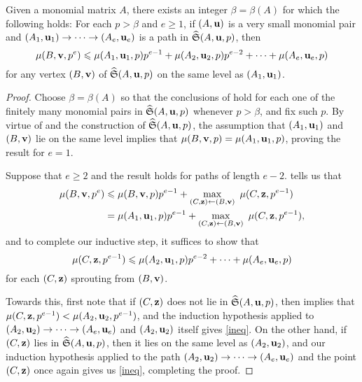 \documentclass[11pt]{amsart}
\begin{document}
\begin{lemma}\label{lem: upper bound for higher mu}
   Given a monomial matrix $A$, there exists an integer $\beta= \beta(A)$ for which the following holds\textup:
   For each $p>\beta$ and $e\ge 1$, if $(A, \mathbf{u})$ is a very small monomial pair and $(A_1, \mathbf{u}_1) \to \cdots \to (A_e, \mathbf{u}_e)$ is a path in $\widehat{\mathfrak{S}}(A, \mathbf{u}, p)$,  then
   \[
      \mu(B, \mathbf{v}, p^e) \leqslant \mu(A_1, \mathbf{u}_1, p)p^{e-1} + \mu(A_2, \mathbf{u}_2, p)p^{e-2} + \cdots + \mu(A_{e}, \mathbf{u}_{e}, p)
   \]
   for any vertex $(B, \mathbf{v})$ of $\widehat{\mathfrak{S}}(A, \mathbf{u}, p)$ on the same level as $(A_1, \mathbf{u}_1)$.
\end{lemma}

\begin{proof}
   Choose $\beta = \beta(A)$ so that the conclusions of   hold for each one of the finitely many monomial pairs in $\widehat{\mathfrak{S}}(A, \mathbf{u},p)$ whenever $p > \beta$, and fix such $p$.
    By virtue of  and the construction of $\widehat{\mathfrak{S}}(A,\mathbf{u},p)$, the assumption that $(A_1, \mathbf{u}_1)$ and $(B, \mathbf{v})$ lie on the same level implies that $\mu(B,\mathbf{v},p) = \mu(A_1, \mathbf{u}_1, p)$, proving the result for $e = 1$.

    Suppose that $e \geq 2$ and the result holds for paths of length $e-2$.
     tells us that
    \begin{align*}
      \mu(B,\mathbf{v},p^e) &\leqslant \mu(B,\mathbf{v},p) p^{e-1} + \max_{(C,\mathbf{z}) \leftarrow (B,\mathbf{v})} \ \mu(C,\mathbf{z},p^{e-1}) \\
      &= \mu(A_1,\mathbf{u}_1,p) p^{e-1} + \max_{(C,\mathbf{z}) \leftarrow (B,\mathbf{v})} \ \mu(C,\mathbf{z},p^{e-1}),
    \end{align*}
    and to complete our inductive step, it suffices to show that
    \begin{equation}\label{ineq}
        \mu(C,\mathbf{z},p^{e-1}) \leqslant \mu(A_2,\mathbf{u}_1,p) p^{e-2} + \cdots + \mu(A_e,\mathbf{u}_e,p)
    \end{equation}
    for each $(C,\mathbf{z})$ sprouting from $(B,\mathbf{v})$.

    Towards this, first note that if $(C, \mathbf{z})$ does not lie in $\widehat{\mathfrak{S}}(A,\mathbf{u},p)$, then  implies that $\mu(C, \mathbf{z},p^{e-1}) < \mu(A_2,\mathbf{u}_2, p^{e-1})$, and the induction hypothesis applied to $(A_2, \mathbf{u}_2) \to \cdots \to (A_e, \mathbf{u}_e)$ and $(A_2,\mathbf{u}_2)$ itself gives \eqref{ineq}.
    On the other hand, if $(C, \mathbf{z})$ lies in $\widehat{\mathfrak{S}}(A, \mathbf{u},p)$, then it lies on the same level as $(A_2, \mathbf{u}_2)$, and  our induction hypothesis applied to the path $(A_2, \mathbf{u}_2) \to \cdots \to (A_e, \mathbf{u}_e)$ and the point $(C, \mathbf{z})$ once again gives us \eqref{ineq}, completing the proof.
\end{proof}
\end{document}

